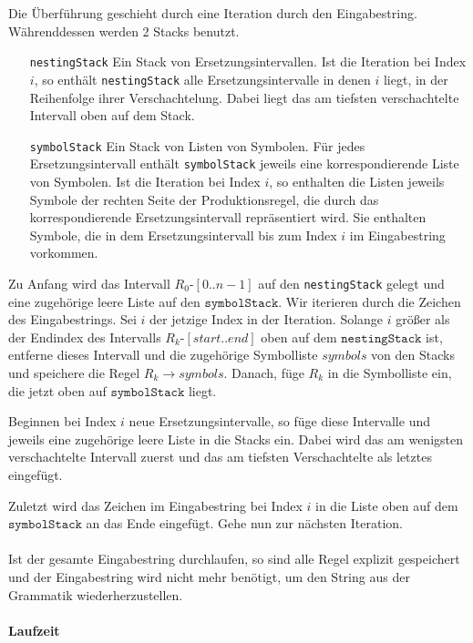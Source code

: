 Die Überführung geschieht durch eine Iteration durch den Eingabestring. Währenddessen werden 2 Stacks benutzt.

\begin{itemize}[leftmargin=2.5cm]
    \item[\texttt{nestingStack}] Ein Stack von Ersetzungsintervallen. Ist die Iteration bei Index $i$, so enthält \texttt{nestingStack} alle Ersetzungsintervalle in denen $i$ liegt, in der Reihenfolge ihrer Verschachtelung. Dabei liegt das am tiefsten verschachtelte Intervall oben auf dem Stack.
    \item[\texttt{symbolStack}] Ein Stack von Listen von Symbolen. Für jedes Ersetzungsintervall enthält \texttt{symbolStack} jeweils eine korrespondierende Liste von Symbolen. 
    Ist die Iteration bei Index $i$, so enthalten die Listen jeweils Symbole der rechten Seite der Produktionsregel, die durch das korrespondierende Ersetzungsintervall repräsentiert wird. Sie enthalten Symbole, die in dem Ersetzungsintervall bis zum Index $i$ im Eingabestring vorkommen. 
\end{itemize} 

Zu Anfang wird das Intervall $R_0$-$[0..n-1]$ auf den \texttt{nestingStack} gelegt und eine zugehörige leere Liste auf den $\texttt{symbolStack}$. 
Wir iterieren durch die Zeichen des Eingabestrings. Sei $i$ der jetzige Index in der Iteration.
Solange $i$ größer als der Endindex des Intervalls $R_k$-$[start..end]$ oben auf dem $\texttt{nestingStack}$ ist, entferne dieses Intervall und die zugehörige Symbolliste $symbols$ von den Stacks und speichere die Regel $R_k \rightarrow symbols$. Danach, füge $R_k$ in die Symbolliste ein, die jetzt oben auf $\texttt{symbolStack}$ liegt.

Beginnen bei Index $i$ neue Ersetzungsintervalle, so füge diese Intervalle und jeweils eine zugehörige leere Liste in die Stacks ein. Dabei wird das am wenigsten verschachtelte Intervall zuerst und das am tiefsten Verschachtelte als letztes eingefügt.

Zuletzt wird das Zeichen im Eingabestring bei Index $i$ in die Liste oben auf dem $\texttt{symbolStack}$ an das Ende eingefügt. Gehe nun zur nächsten Iteration.\\\\

Ist der gesamte Eingabestring durchlaufen, so sind alle Regel explizit gespeichert und der Eingabestring wird nicht mehr benötigt, um den String aus der Grammatik wiederherzustellen.

\paragraph{Laufzeit}

